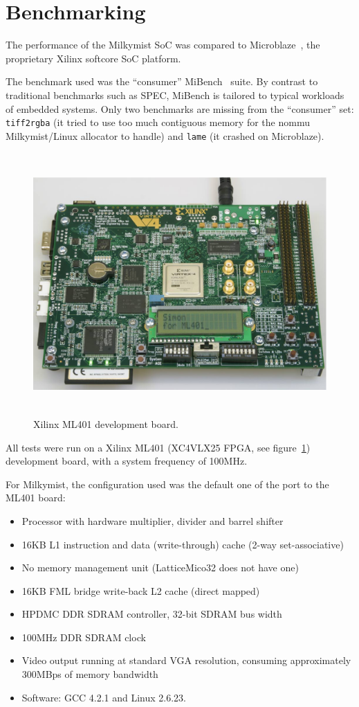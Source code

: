 \documentclass[a4paper,11pt]{kthesis}
\begin{document}
\section{Benchmarking}
The performance of the Milkymist SoC was compared to Microblaze~\cite{microblaze}, the proprietary Xilinx softcore SoC platform.

The benchmark used was the ``consumer'' MiBench~\cite{mibench} suite. By contrast to traditional benchmarks such as SPEC, MiBench is tailored to typical workloads of embedded systems. Only two benchmarks are missing from the ``consumer'' set: \verb!tiff2rgba! (it tried to use too much contiguous memory for the nommu Milkymist/Linux allocator to handle) and \verb!lame! (it crashed on Microblaze).

\begin{figure}[htp]
\centering
\includegraphics[height=100mm]{ml401.eps}
\caption{Xilinx ML401 development board.}
\label{fig:ml401}
\end{figure}

All tests were run on a Xilinx ML401 (XC4VLX25 FPGA, see figure~\ref{fig:ml401}) development board, with a system frequency of 100MHz.

For Milkymist, the configuration used was the default one of the port to the ML401 board:
\begin{itemize}
\item Processor with hardware multiplier, divider and barrel shifter
\item 16KB L1 instruction and data (write-through) cache (2-way set-associative)
\item No memory management unit (LatticeMico32 does not have one)
\item 16KB FML bridge write-back L2 cache (direct mapped)
\item HPDMC DDR SDRAM controller, 32-bit SDRAM bus width
\item 100MHz DDR SDRAM clock
\item Video output running at standard VGA resolution, consuming approximately 300MBps of memory bandwidth
\item Software: GCC 4.2.1 and Linux 2.6.23.
\end{itemize}
\end{document}
